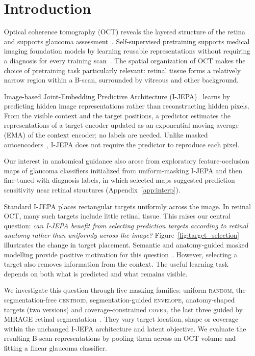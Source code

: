 \documentclass{article}
\newcommand{\ArmBest}{\textsc{centroid}}
\begin{document}
\section{Introduction}

Optical coherence tomography (OCT) reveals the layered structure of the retina
and supports glaucoma assessment~\citep{maetschke2019glaucoma,ran2019glaucoma,noury2022glaucoma}.
Self-supervised pretraining supports medical imaging foundation models by
learning reusable representations without requiring a diagnosis for every
training scan~\citep{azizi2021big,zhou2023retfound,qiu2024visionfm}.
The spatial organization of OCT makes the choice of pretraining task
particularly relevant: retinal tissue forms a relatively narrow region within
a B-scan, surrounded by vitreous and other background.

Image-based Joint-Embedding Predictive Architecture
(I-JEPA)~\citep{assran2023ijepa} learns by predicting hidden image
representations rather than reconstructing hidden pixels. From the visible
context and the target positions, a predictor estimates the representations of
a target encoder updated as an exponential moving average (EMA) of the context
encoder; no labels are needed. Unlike masked autoencoders~\citep{he2022mae,xie2022simmim}, I-JEPA does not
require the predictor to reproduce each pixel.

Our interest in anatomical guidance also arose from exploratory
feature-occlusion maps of glaucoma classifiers initialized from
uniform-masking I-JEPA and then fine-tuned with diagnosis labels, in which
selected maps suggested prediction sensitivity near retinal structures
(Appendix~\ref{app:interp}).

Standard I-JEPA places rectangular targets uniformly across the image.
In retinal OCT, many such targets include little retinal tissue. This raises
our central question: \emph{can I-JEPA benefit from selecting prediction
targets according to retinal anatomy rather than uniformly across the image?}
Figure~\ref{fig:target_selection} illustrates the change in target placement.
Semantic and anatomy-guided masked modelling provide positive motivation
for this question~\citep{li2022semmae,kakogeorgiou2022attmask,li2024anatomask,wang2025maskwhatmatters}.
However, selecting a target also removes information from the context.
The useful learning task depends on both what is predicted and what remains
visible.

We investigate this question through five masking families: uniform
\textsc{random}, the segmentation-free \ArmBest{}, segmentation-guided
\textsc{envelope}, anatomy-shaped targets (two versions) and coverage-constrained
\textsc{cover}, the last three guided by MIRAGE retinal
segmentation~\citep{morano2025mirage}. They vary target location, shape or
coverage within the unchanged I-JEPA architecture and latent objective.
We evaluate the resulting B-scan representations
by pooling them across an OCT volume and fitting a linear glaucoma classifier.
\end{document}
